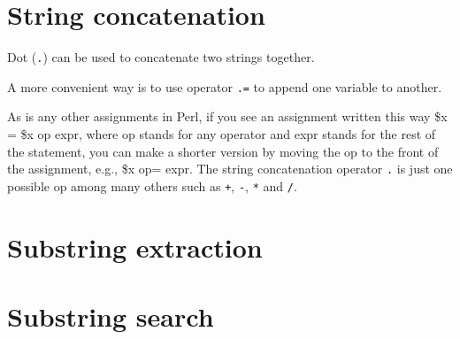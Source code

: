 \documentclass[]{book}
\makeatletter
\newenvironment{Shaded}{\begin{snugshade}}{\end{snugshade}}
\newcommand{\DataTypeTok}[1]{\textcolor[rgb]{0.13,0.29,0.53}{#1}}
\newcommand{\DecValTok}[1]{\textcolor[rgb]{0.00,0.00,0.81}{#1}}
\newcommand{\CommentTok}[1]{\textcolor[rgb]{0.56,0.35,0.01}{\textit{#1}}}
\newcommand{\NormalTok}[1]{#1}
\newenvironment{kframe}{%
\medskip{}
\setlength{\fboxsep}{.8em}
 \def\at@end@of@kframe{}%
 \ifinner\ifhmode%
  \def\at@end@of@kframe{\end{minipage}}%
  \begin{minipage}{\columnwidth}%
 \fi\fi%
 \def\FrameCommand##1{\hskip\@totalleftmargin \hskip-\fboxsep
 \colorbox{shadecolor}{##1}\hskip-\fboxsep
     \hskip-\linewidth \hskip-\@totalleftmargin \hskip\columnwidth}%
 \MakeFramed {\advance\hsize-\width
   \@totalleftmargin\z@ \linewidth\hsize
   \@setminipage}}%
 {\par\unskip\endMakeFramed%
 \at@end@of@kframe}
\renewenvironment{Shaded}{\begin{kframe}}{\end{kframe}}
\theoremstyle{definition}
\theoremstyle{definition}
\theoremstyle{definition}
\theoremstyle{remark}
\makeatother
\begin{document}
\section{String concatenation}\label{string-concatenation-1}

Dot (\texttt{.}) can be used to concatenate two strings together.

\begin{Shaded}
\end{Shaded}

A more convenient way is to use operator \texttt{.=} to append one
variable to another.

As is any other assignments in Perl, if you see an assignment written
this way \$x = \$x op expr, where op stands for any operator and expr
stands for the rest of the statement, you can make a shorter version by
moving the op to the front of the assignment, e.g., \$x op= expr. The
string concatenation operator \texttt{.} is just one possible op among
many others such as \texttt{+}, \texttt{-}, \texttt{*} and \texttt{/}.

\begin{Shaded}
\end{Shaded}

\section{Substring extraction}\label{substring-extraction-1}

\section{Substring search}\label{substring-search-1}
\end{document}
